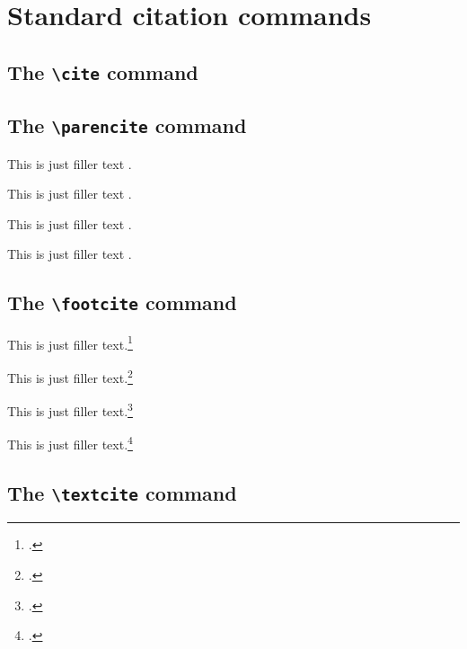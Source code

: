 \documentclass[a4paper]{article}
\newcommand{\cmd}[1]{\texttt{\textbackslash #1}}
\begin{document}
\section*{Standard citation commands}

\subsection*{The \cmd{cite} command}


\cite{companion}

\cite[59]{companion}

\cite[See][]{companion}

\cite[See][59--63]{companion}

\subsection*{The \cmd{parencite} command}


This is just filler text \parencite{companion}.

This is just filler text \parencite[59]{companion}.

This is just filler text \parencite[See][]{companion}.

This is just filler text \parencite[See][59--63]{companion}.

\subsection*{The \cmd{footcite} command}


This is just filler text.\footcite{companion}

This is just filler text.\footcite[59]{companion}

This is just filler text.\footcite[See][]{companion}

This is just filler text.\footcite[See][59--63]{companion}

\subsection*{The \cmd{textcite} command}
\end{document}
